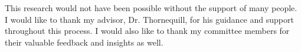 This research would not have been possible without the support of many people. I would like to thank my advisor, Dr. Thornequill, for his guidance and support throughout this process. I would also like to thank my committee members for their valuable feedback and insights as well.